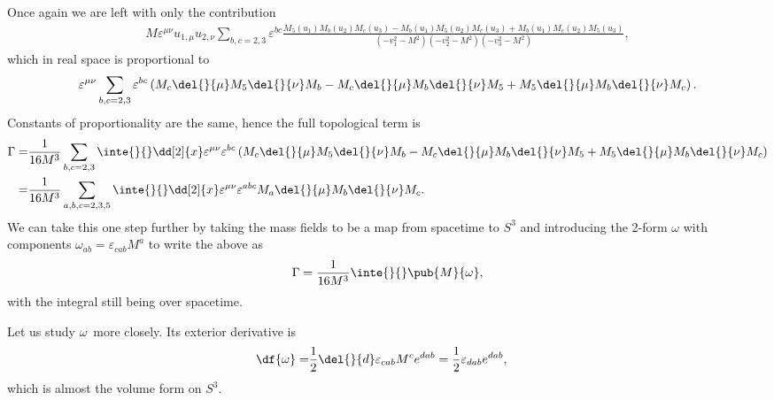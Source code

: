 Once again we are left with only the contribution
\begin{align*}
	M\varepsilon^{\mu\nu}u_{1, \mu}u_{2, \nu}\sum\limits_{b, c = 2, 3}\varepsilon^{bc}\frac{M_{5}(u_{1})M_{b}(u_{2})M_{c}(u_{3}) - M_{b}(u_{1})M_{5}(u_{2})M_{c}(u_{3}) + M_{b}(u_{1})M_{c}(u_{2})M_{5}(u_{3})}{(-v_{1}^{2} - M^{2})(-v_{2}^{2} - M^{2})(-v_{3}^{2} - M^{2})},
\end{align*}
which in real space is proportional to
\begin{align*}
	\varepsilon^{\mu\nu}\sum\limits_{b, c = 2, 3}\varepsilon^{bc}\left(M_{c}\del{}{\mu}M_{5}\del{}{\nu}M_{b} - M_{c}\del{}{\mu}M_{b}\del{}{\nu}M_{5} + M_{5}\del{}{\mu}M_{b}\del{}{\nu}M_{c}\right).
\end{align*}
Constants of proportionality are the same, hence the full topological term is
\begin{align*}
	\Gamma =& \frac{1}{16M^{3}}\sum\limits_{b, c = 2, 3}\inte{}{}\dd[2]{x}\varepsilon^{\mu\nu}\varepsilon^{bc}\left(M_{c}\del{}{\mu}M_{5}\del{}{\nu}M_{b} - M_{c}\del{}{\mu}M_{b}\del{}{\nu}M_{5} + M_{5}\del{}{\mu}M_{b}\del{}{\nu}M_{c}\right) \\
	       =& \frac{1}{16M^{3}}\sum\limits_{a, b, c = 2, 3, 5}\inte{}{}\dd[2]{x}\varepsilon^{\mu\nu}\varepsilon^{abc}M_{a}\del{}{\mu}M_{b}\del{}{\nu}M_{c}.
\end{align*}
We can take this one step further by taking the mass fields to be a map from spacetime to $S^{3}$ and introducing the 2-form $\omega$ with components $\omega_{ab} = \varepsilon_{cab}M^{a}$ to write the above as
\begin{align*}
	\Gamma = \frac{1}{16M^{3}}\inte{}{}\pub{M}{\omega},
\end{align*}
with the integral still being over spacetime.

Let us study $\omega$ more closely. Its exterior derivative is
\begin{align*}
	\df{\omega} =& \frac{1}{2}\del{}{d}\varepsilon_{cab}M^{c}e^{dab} = \frac{1}{2}\varepsilon_{dab}e^{dab},
\end{align*}
which is almost the volume form on $S^{3}$.

